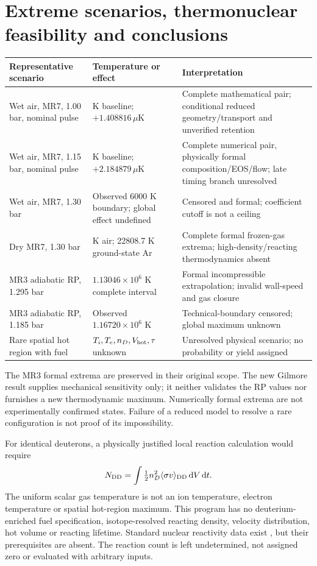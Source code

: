 \documentclass[10pt,a4paper]{article}
\newcommand{\dd}{\mathrm d}
\begin{document}
\section{Extreme scenarios, thermonuclear feasibility and conclusions}
\begin{center}\small
\begin{tabular}{>{\raggedright\arraybackslash}p{4.2cm}>{\raggedright\arraybackslash}p{4.4cm}>{\raggedright\arraybackslash}p{6.3cm}}\toprule
Representative scenario&Temperature or effect&Interpretation\\\midrule
Wet air, MR7, 1.00 bar, nominal pulse&553.023 K baseline; $+1.408816\,\mu$K&Complete mathematical pair; conditional reduced geometry/transport and unverified retention\\[4pt]
Wet air, MR7, 1.15 bar, nominal pulse&2798.281 K baseline; $+2.184879\,\mu$K&Complete numerical pair, physically formal composition/EOS/flow; late timing branch unresolved\\[4pt]
Wet air, MR7, 1.30 bar&Observed 6000 K boundary; global effect undefined&Censored and formal; coefficient cutoff is not a ceiling\\[4pt]
Dry MR7, 1.30 bar&6263.58 K air; 22808.7 K ground-state Ar&Complete formal frozen-gas extrema; high-density/reacting thermodynamics absent\\[4pt]
MR3 adiabatic RP, 1.295 bar&$1.13046\times10^6$ K complete interval&Formal incompressible extrapolation; invalid wall-speed and gas closure\\[4pt]
MR3 adiabatic RP, 1.185 bar&Observed $1.16720\times10^6$ K&Technical-boundary censored; global maximum unknown\\[4pt]
Rare spatial hot region with fuel&$T_i,T_e,n_D,V_{\rm hot},\tau$ unknown&Unresolved physical scenario; no probability or yield assigned\\\bottomrule
\end{tabular}
\end{center}
The MR3 formal extrema are preserved in their original scope.
The new Gilmore result supplies mechanical sensitivity only; it neither validates the RP values nor furnishes a new thermodynamic maximum. Numerically formal extrema are not experimentally confirmed states. Failure of a reduced model to resolve a rare configuration is not proof of its impossibility.

For identical deuterons, a physically justified local reaction calculation would require
\begin{equation}
N_{\rm DD}=\int\tfrac12 n_D^2\langle\sigma v\rangle_{\rm DD}\,\dd V\,\dd t.
\end{equation}
The uniform scalar gas temperature is not an ion temperature, electron temperature or spatial hot-region maximum. This program has no deuterium-enriched fuel specification, isotope-resolved reacting density, velocity distribution, hot volume or reacting lifetime. Standard nuclear reactivity data exist \cite{reactivity}, but their prerequisites are absent. The reaction count is left undetermined, not assigned zero or evaluated with arbitrary inputs.
\end{document}

